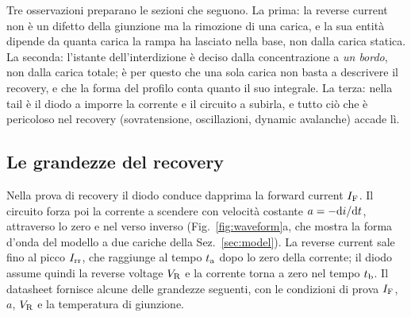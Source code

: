 \documentclass[10pt,a4paper]{scrartcl}
\let\newcommand\pdvaluedefine
\newcommand{\IF}{I_\mathrm{F}}
\newcommand{\VR}{V_\mathrm{R}}
\newcommand{\Irr}{I_\mathrm{rr}}
\newcommand{\ta}{t_\mathrm{a}}
\newcommand{\tb}{t_\mathrm{b}}
\newcommand{\diff}{\mathrm{d}}
\begin{document}
Tre osservazioni preparano le sezioni che seguono. La prima: la reverse current non è un difetto della giunzione ma la rimozione di una carica, e la sua entità dipende da quanta carica la rampa ha lasciato nella base, non dalla carica statica. La seconda: l'istante dell'interdizione è deciso dalla concentrazione a \emph{un bordo}, non dalla carica totale; è per questo che una sola carica non basta a descrivere il recovery, e che la forma del profilo conta quanto il suo integrale. La terza: nella tail è il diodo a imporre la corrente e il circuito a subirla, e tutto ciò che è pericoloso nel recovery (sovratensione, oscillazioni, dynamic avalanche) accade lì.
\subsection{Le grandezze del recovery}
\label{sec:rrdata}
Nella prova di recovery il diodo conduce dapprima la forward current $\IF$. Il circuito forza poi la corrente a scendere con velocità costante $a = -\diff i/\diff t$, attraverso lo zero e nel verso inverso (Fig.~\ref{fig:waveform}a, che mostra la forma d'onda del modello a due cariche della Sez.~\ref{sec:model}). La reverse current sale fino al picco $\Irr$, che raggiunge al tempo $\ta$ dopo lo zero della corrente; il diodo assume quindi la reverse voltage $\VR$ e la corrente torna a zero nel tempo $\tb$. Il datasheet fornisce alcune delle grandezze seguenti, con le condizioni di prova $\IF$, $a$, $\VR$ e la temperatura di giunzione.
\end{document}
